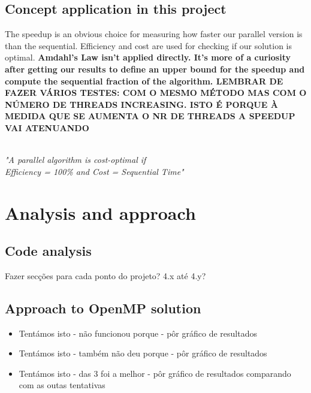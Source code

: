 \documentclass[10pt,journal,compsoc]{IEEEtran}
\begin{document}
\subsection{Concept application in this project}
The speedup is an obvious choice for measuring how faster our parallel version is than the sequential. Efficiency and cost are used for checking if our solution is optimal. \textbf{Amdahl's Law isn't applied directly. It's more of a curiosity after getting our results to define an upper bound for the speedup and compute the sequential fraction of the algorithm. LEMBRAR DE FAZER VÁRIOS TESTES: COM O MESMO MÉTODO MAS COM O NÚMERO DE THREADS INCREASING. ISTO É PORQUE À MEDIDA QUE SE AUMENTA O NR DE THREADS A SPEEDUP VAI ATENUANDO} 
\begin{center}
\textit{\\"A parallel algorithm is cost-optimal if\\ Efficiency = 100\% and Cost = Sequential Time"}
\end{center}

\section{Analysis and approach}

\subsection{Code analysis}
Fazer secções para cada ponto do projeto? 4.x até 4.y?

\subsection{Approach to OpenMP solution}
\begin{itemize}
    \item Tentámos isto - não funcionou porque - pôr gráfico de resultados
    \item Tentámos isto - também não deu porque - pôr gráfico de resultados
    \item Tentámos isto - das 3 foi a melhor - pôr gráfico de resultados comparando com as outas tentativas
\end{itemize}
\end{document}
